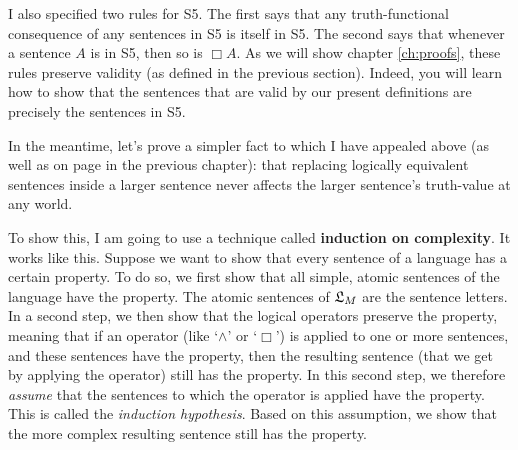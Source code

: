 
I also specified two rules for S5. The first says that any truth-functional
consequence of any sentences in S5 is itself in S5. The second says that
whenever a sentence $A$ is in S5, then so is $\Box A$. As we will show chapter
\ref{ch:proofs}, these rules preserve validity (as defined in the previous
section). Indeed, you will learn how to show that the sentences that are
valid by our present definitions are precisely the sentences in S5.

In the meantime, let's prove a simpler fact to which I have appealed above (as
well as on page \pageref{claim:replacement} in the previous chapter): that
replacing logically equivalent sentences inside a larger sentence never affects
the larger sentence's truth-value at any world.

To show this, I am going to use a technique called \textbf{induction on
  complexity}. It works like this. Suppose we want to show that every sentence
of a language has a certain property. To do so, we first show that all simple,
atomic sentences of the language have the property. The atomic sentences of
$\mathfrak{L}_{M}$ are the sentence letters. In a second step, we then show that the
logical operators preserve the property, meaning that if an operator (like
`$\land$' or `$\Box$') is applied to one or more sentences, and these sentences
have the property, then the resulting sentence (that we get by applying the
operator) still has the property. In this second step, we therefore
\emph{assume} that the sentences to which the operator is applied have the
property. This is called the \emph{induction hypothesis}. Based on this
assumption, we show that the more complex resulting sentence still has the
property.

